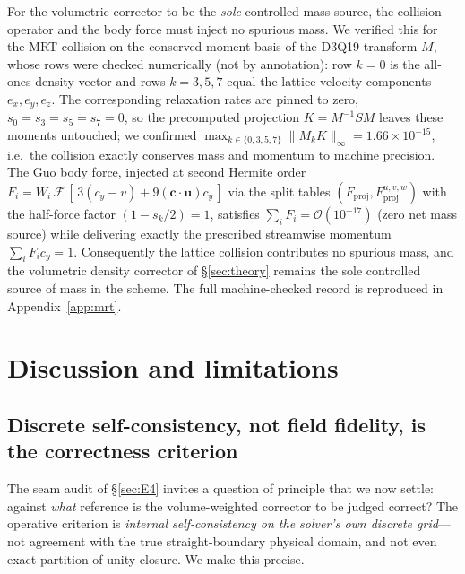\documentclass[11pt]{article}
\theoremstyle{definition}
\theoremstyle{remark}
\begin{document}
For the volumetric corrector to be the \emph{sole} controlled mass source, the
collision operator and the body force must inject no spurious mass. We verified
this for the MRT collision on the conserved-moment basis of the D3Q19 transform
$M$, whose rows were checked numerically (not by annotation): row $k{=}0$ is the
all-ones density vector and rows $k{=}3,5,7$ equal the lattice-velocity components
$e_x,e_y,e_z$. The corresponding relaxation rates are pinned to zero,
$s_0{=}s_3{=}s_5{=}s_7{=}0$, so the precomputed projection $K=M^{-1}SM$ leaves these
moments untouched; we confirmed
$\max_{k\in\{0,3,5,7\}}\|M_k K\|_\infty = 1.66\times10^{-15}$, i.e.\ the collision
exactly conserves mass and momentum to machine precision. The Guo body force,
injected at second Hermite order
$F_i = W_i\,\mathcal{F}\,[\,3(c_{y}-v)+9(\mathbf{c}\!\cdot\!\mathbf{u})c_{y}\,]$ via
the split tables $(F_{\mathrm{proj}},F_{\mathrm{proj}}^{u,v,w})$ with the half-force
factor $(1-s_k/2){=}1$, satisfies $\sum_i F_i = \mathcal{O}(10^{-17})$ (zero net mass
source) while delivering exactly the prescribed streamwise momentum
$\sum_i F_i c_{y}=1$. Consequently the lattice collision contributes no spurious
mass, and the volumetric density corrector of \S\ref{sec:theory} remains the sole
controlled source of mass in the scheme. The full machine-checked record is
reproduced in Appendix~\ref{app:mrt}.

\section{Discussion and limitations}
\label{sec:discussion}

\subsection{Discrete self-consistency, not field fidelity, is the correctness criterion}
\label{sec:self-consistency}

The seam audit of \S\ref{sec:E4} invites a question of principle that we now
settle: against \emph{what} reference is the volume-weighted corrector to be
judged correct? The operative criterion is \emph{internal self-consistency on the
solver's own discrete grid}---not agreement with the true straight-boundary
physical domain, and not even exact partition-of-unity closure. We make this
precise.
\end{document}
